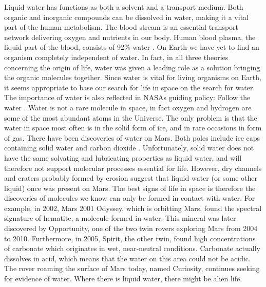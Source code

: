 Liquid water has functions as both a solvent and a transport medium.
Both organic and inorganic compounds can be dissolved in water, making it a vital part of the human metabolism.
The blood stream is an essential transport network delivering oxygen and nutrients in our body.
Human blood plasma, the liquid part of the blood, consists of 92\% water \cite{Blood}.
On Earth we have yet to find an organism completely independent of water. 
In fact, in all three theories concerning the origin of life, water was given a leading role as a solution bringing the organic molecules together. 
Since water is vital for living organisms on Earth, it seems appropriate to base our search for life in space on the search for water.
The importance of water is also reflected in NASAs guiding policy: Follow the water \cite{NASAwater}. 
Water is not a rare molecule in space, in fact oxygen and hydrogen are some of the most abundant atoms in the Universe.
The only problem is that the water in space most often is in the solid form of ice, and in rare occasions in form of gas.
There have been discoveries of water on Mars. 
Both poles include ice caps containing solid water and carbon dioxide \cite{MARSwater}. 
Unfortunately, solid water does not have the same solvating and lubricating properties as liquid water, and will therefore not support molecular processes essential for life.
However, dry channels and craters probably formed by erosion suggest that liquid water (or some other liquid) once was present on Mars.
The best signs of life in space is therefore the discoveries of molecules we know can only be formed in contact with water.
For example, in 2002, Mars 2001 Odyssey, which is orbitting Mars, found the spectral signature of hematite, a molecule formed in water. 
This mineral was later discovered by Opportunity, one of the two twin rovers exploring Mars from 2004 to 2010.
Furthermore, in 2005, Spirit, the other twin, found high concentrations of carbonate which originates in wet, near-neutral conditions. 
Carbonate actually dissolves in acid, which means that the water on this area could not be acidic.
The rover roaming the surface of Mars today, named Curiosity, continues seeking for evidence of water. 
Where there is liquid water, there might be alien life. 